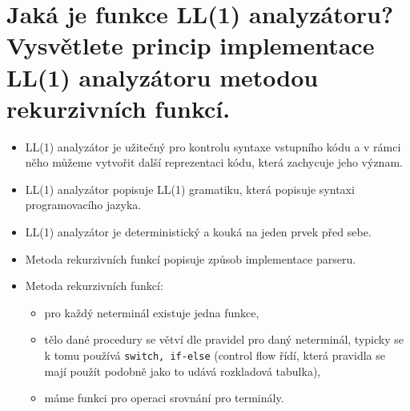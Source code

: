 \documentclass{article}
\begin{document}
\newpage

\section{Jaká je funkce LL(1) analyzátoru? Vysvětlete princip implementace LL(1) analyzátoru metodou rekurzivních funkcí.}
\begin{itemize}
  \item LL(1) analyzátor je užitečný pro kontrolu syntaxe vstupního kódu a v rámci něho můžeme vytvořit další reprezentaci kódu, která zachycuje jeho význam.
  \item LL(1) analyzátor popisuje LL(1) gramatiku, která popisuje syntaxi programovacího jazyka.
  \item LL(1) analyzátor je deterministický a kouká na jeden prvek před sebe.
  \item Metoda rekurzivních funkcí popisuje způsob implementace parseru.
  \item \textcolor{myPink}{Metoda rekurzivních funkcí:}
  \begin{itemize}
      \item pro každý neterminál existuje jedna funkce,
      \item tělo dané procedury se větví dle pravidel pro daný neterminál, typicky se k tomu používá \verb|switch, if-else| (control flow řídí, která pravidla se mají použít podobně jako to udává rozkladová tabulka),
      \item máme funkci pro operaci srovnání pro terminály.
  \end{itemize}    
\end{itemize}
\newpage
\end{document}
